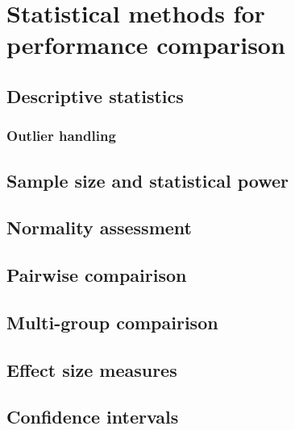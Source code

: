 \section{Statistical methods for performance comparison}
\subsection{Descriptive statistics}
\subsubsection{Outlier handling}
\subsection{Sample size and statistical power}
\subsection{Normality assessment}
\subsection{Pairwise compairison}
\subsection{Multi-group compairison}
\subsection{Effect size measures}
\subsection{Confidence intervals}
